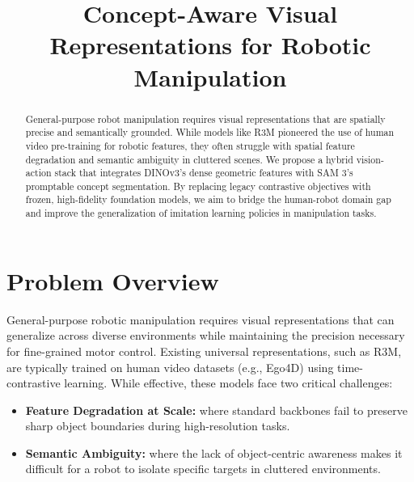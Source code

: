 \documentclass[conference]{IEEEtran}
\begin{document}
\title{Concept-Aware Visual Representations for Robotic Manipulation}

\author{
\and
{}
}

\maketitle

\begin{abstract}
General-purpose robot manipulation requires visual representations that are spatially precise and semantically grounded. While models like R3M pioneered the use of human video pre-training for robotic features, they often struggle with spatial feature degradation and semantic ambiguity in cluttered scenes. We propose a hybrid vision-action stack that integrates DINOv3's dense geometric features with SAM 3's promptable concept segmentation. By replacing legacy contrastive objectives with frozen, high-fidelity foundation models, we aim to bridge the human-robot domain gap and improve the generalization of imitation learning policies in manipulation tasks.
\end{abstract}

\IEEEpeerreviewmaketitle

\section{Problem Overview}
General-purpose robotic manipulation requires visual representations that can generalize across diverse environments while maintaining the precision necessary for fine-grained motor control. Existing universal representations, such as R3M, are typically trained on human video datasets (e.g., Ego4D) using time-contrastive learning. While effective, these models face two critical challenges: 
\begin{itemize}
    \item \textbf{Feature Degradation at Scale:} where standard backbones fail to preserve sharp object boundaries during high-resolution tasks.
    \item  \textbf{Semantic Ambiguity:} where the lack of object-centric awareness makes it difficult for a robot to isolate specific targets in cluttered environments. 
\end{itemize}
\end{document}

